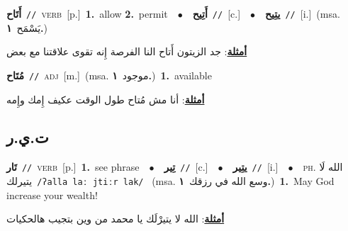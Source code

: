 \documentclass[10pt,a4paper,twoside]{article} %
\begin{document}
\begin{multicols}{2}
{\setlength\topsep{0pt}\textbf{\foreignlanguage{arabic}{أَتَاح}}\ {\color{gray}\texttt{//}\color{black}}\ \textsc{verb}\ [p.]\ \textbf{1.}~allow  \textbf{2.}~permit\ \ $\bullet$\ \ \setlength\topsep{0pt}\textbf{\foreignlanguage{arabic}{أَتِيح}}\ {\color{gray}\texttt{//}\color{black}}\ [c.]\ \ $\bullet$\ \ \setlength\topsep{0pt}\textbf{\foreignlanguage{arabic}{يتِيح}}\ {\color{gray}\texttt{//}\color{black}}\ [i.]\ \color{gray}(msa. \foreignlanguage{arabic}{يَسْمَح}~\foreignlanguage{arabic}{\textbf{١.}})\color{black}\  \begin{flushright}\color{gray}\foreignlanguage{arabic}{\textbf{\underline{\foreignlanguage{arabic}{أمثلة}}}: جد الزيتون أَتاح النا الفرصة إِنه تقوى علاقتنا مع بعض}\end{flushright}\color{black}} \vspace{2mm}

{\setlength\topsep{0pt}\textbf{\foreignlanguage{arabic}{مُتَاح}}\ {\color{gray}\texttt{//}\color{black}}\ \textsc{adj}\ [m.]\ \color{gray}(msa. \foreignlanguage{arabic}{موجود}~\foreignlanguage{arabic}{\textbf{١.}})\color{black}\ \textbf{1.}~available\  \begin{flushright}\color{gray}\foreignlanguage{arabic}{\textbf{\underline{\foreignlanguage{arabic}{أمثلة}}}: أنا مش مُتاح طول الوقت عكيف إِمك وإِمه}\end{flushright}\color{black}} \vspace{2mm}

\vspace{-3mm}
\subsection*{\color{blue}\foreignlanguage{arabic}{ت.ي.ر}\color{blue}{}} 

{\setlength\topsep{0pt}\textbf{\foreignlanguage{arabic}{تَار}}\ {\color{gray}\texttt{//}\color{black}}\ \textsc{verb}\ [p.]\ \textbf{1.}~see phrase\ \ $\bullet$\ \ \setlength\topsep{0pt}\textbf{\foreignlanguage{arabic}{تِير}}\ {\color{gray}\texttt{//}\color{black}}\ [c.]\ \ $\bullet$\ \ \setlength\topsep{0pt}\textbf{\foreignlanguage{arabic}{يتِير}}\ {\color{gray}\texttt{//}\color{black}}\ [i.]\ \ $\bullet$\ \ \textsc{ph.} \color{gray} \foreignlanguage{arabic}{الله لَا يتيرلك}\color{black}\ {\color{gray}\texttt{/{\sffamily ʔalla laː jtiːr lak}/}\color{black}}\ \color{gray} (msa. \foreignlanguage{arabic}{وسع الله في رزقك}~\foreignlanguage{arabic}{\textbf{١.}})\color{black}\ \textbf{1.}~May God increase your wealth!\  \begin{flushright}\color{gray}\foreignlanguage{arabic}{\textbf{\underline{\foreignlanguage{arabic}{أمثلة}}}: الله لا يتيرْلَك يا محمد من وين بتجيب هالحكيات}\end{flushright}\color{black}} \vspace{2mm}


\end{multicols}
\end{document}
